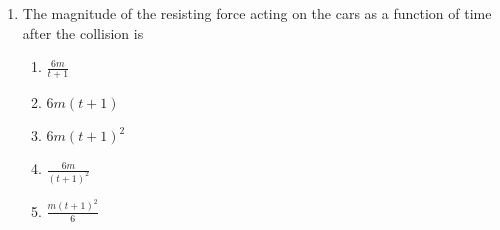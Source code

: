 \documentclass{../../../oss-apphys}
\begin{document}
\begin{multicols}{2}
\begin{enumerate}[resume,leftmargin=18pt]
  \item The magnitude of the resisting force acting on the cars as a function of
    time after the collision is
    \label{remote2}
    \begin{enumerate}[noitemsep,topsep=0pt,leftmargin=18pt,label=(\Alph*)]
    \item $\displaystyle \frac{6m}{t+1}$
    \item $6m(t+1)$
    \item $6m(t+1)^2$
    \item $\displaystyle\frac{6m}{(t+1)^2}$
    \item $\displaystyle\frac{m(t+1)^2}{6}$
    \end{enumerate}
    
    \columnbreak
    

\end{enumerate}
\end{multicols}
\end{document}
